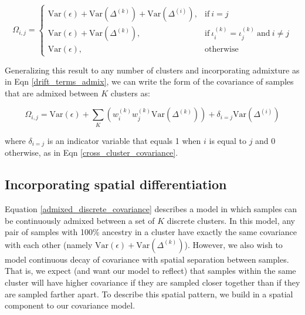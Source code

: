 \documentclass[12pt]{article}
\begin{document}
\begin{equation}
	\Omega_{i,j} = 
	\begin{cases}
	      \text{Var}(\epsilon) +  \text{Var}\left( \Delta^{(k)} \right) + \text{Var}\left( \Delta^{(i)} \right), & \text{if}\ i=j\ \\
      	      \text{Var}(\epsilon) +  \text{Var}\left( \Delta^{(k)} \right), & \text{if}\ \iota^{(k)}_i = \iota^{(k)}_j\ \text{and}\ i \neq j \\
	      \text{Var}(\epsilon), & \text{otherwise}
	\end{cases}
\label{MVN_covar}
\end{equation}


Generalizing this result to any number of clusters and incorporating admixture as in Eqn \ref{drift_terms_admix}, 
we can write the form of the covariance of samples that are admixed between $K$ clusters as:

\begin{equation}
\Omega_{i,j} = \text{Var}(\epsilon) + \sum\limits_K \left(	w^{(k)}_iw^{(k)}_j \text{Var}(\Delta^{(k)}) 	\right) + 
\delta_{i=j} \text{Var}(\Delta^{(i)})
\label{admixed_discrete_covariance}
\end{equation}

where $\delta_{i=j}$ is an indicator variable that equals 1 when $i$ is equal to $j$ and 0 otherwise,
as in Eqn \ref{cross_cluster_covariance}.


\subsection{Incorporating spatial differentiation}
Equation \ref{admixed_discrete_covariance} describes a model in which 
samples can be continuously admixed between a set of $K$ discrete clusters.
In this model, any pair of samples with 100\% ancestry in a cluster 
have exactly the same covariance with each other (namely $\text{Var}(\epsilon) + \text{Var}(\Delta^{(k)})$).
However, we also wish to model continuous decay of covariance with spatial separation between samples.
That is, we expect (and want our model to reflect) that samples within the same cluster 
will have higher covariance if they are sampled closer together than if they are sampled farther apart.
To describe this spatial pattern, we build in a spatial component to our covariance model.
\end{document}
